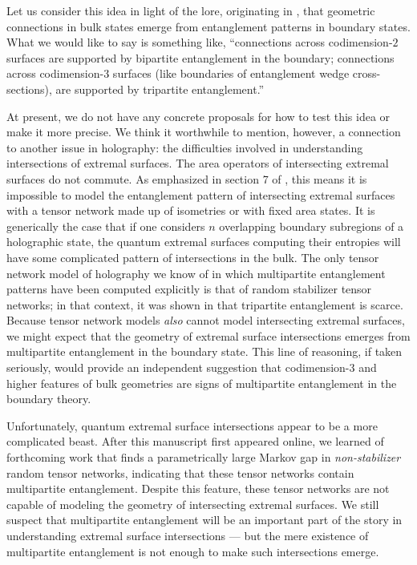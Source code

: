 \documentclass[a4paper,11pt]{article}
\begin{document}
Let us consider this idea in light of the lore, originating in \cite{van2010building}, that geometric connections in bulk states emerge from entanglement patterns in boundary states. What we would like to say is something like, ``connections across codimension-$2$ surfaces are supported by bipartite entanglement in the boundary; connections across codimension-$3$ surfaces (like boundaries of entanglement wedge cross-sections), are supported by tripartite entanglement.''

At present, we do not have any concrete proposals for how to test this idea or make it more precise. We think it worthwhile to mention, however, a connection to another issue in holography: the difficulties involved in understanding intersections of extremal surfaces. The area operators of intersecting extremal surfaces do not commute. As emphasized in section 7 of \cite{bao2019beyond}, this means it is impossible to model the entanglement pattern of intersecting extremal surfaces with a tensor network made up of isometries or with fixed area states. It is generically the case that if one considers $n$ overlapping boundary subregions of a holographic state, the quantum extremal surfaces computing their entropies will have some complicated pattern of intersections in the bulk. The only tensor network model of holography we know of in which multipartite entanglement patterns have been computed explicitly is that of random stabilizer tensor networks; in that context, it was shown in \cite{nezami2020multipartite} that tripartite entanglement is scarce. Because tensor network models \emph{also} cannot model intersecting extremal surfaces, we might expect that the geometry of extremal surface intersections emerges from multipartite entanglement in the boundary state. This line of reasoning, if taken seriously, would provide an independent suggestion that codimension-$3$ and higher features of bulk geometries are signs of multipartite entanglement in the boundary theory.

Unfortunately, quantum extremal surface intersections appear to be a more complicated beast. After this manuscript first appeared online, we learned of forthcoming work \cite{akers2021reflected} that finds a parametrically large Markov gap in \emph{non-stabilizer} random tensor networks, indicating that these tensor networks contain multipartite entanglement. Despite this feature, these tensor networks are not capable of modeling the geometry of intersecting extremal surfaces. We still suspect that multipartite entanglement will be an important part of the story in understanding extremal surface intersections --- but the mere existence of multipartite entanglement is not enough to make such intersections emerge.
\end{document}
